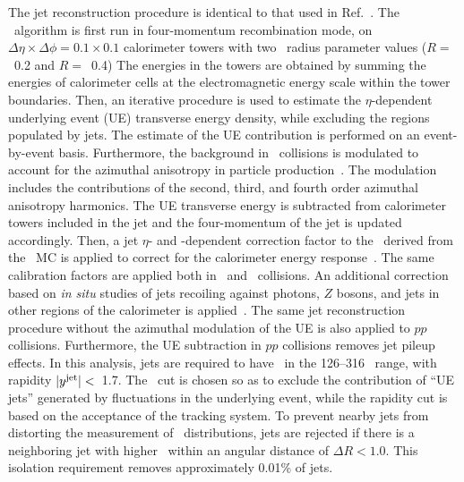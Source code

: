 
The jet reconstruction procedure is identical to that used in Ref.~\cite{2019108}. The \antikt\ algorithm \cite{Cacciari:2008qp, Fastjet} is first run in four-momentum recombination mode, on
$\Delta \eta \times \Delta \phi = 0.1\times 0.1$  calorimeter towers with two \antikt\ radius parameter values ($R=$~0.2 and $R=$~0.4) The energies in the towers are obtained by summing the
	energies of calorimeter cells at the electromagnetic energy scale within the tower boundaries. Then,
	  an iterative procedure is used to estimate the $\eta$-dependent underlying event (UE)  transverse energy density, while excluding the regions populated by jets. The estimate of the UE contribution is performed on an event-by-event basis.
	Furthermore, the background in \pbpb\ collisions is modulated to account for the azimuthal anisotropy in particle production~\cite{ATLAS:2012at}. The modulation includes the contributions of the second, third, and fourth order azimuthal anisotropy harmonics.
	The UE transverse energy is subtracted from calorimeter towers included in the jet and the four-momentum of the jet is updated accordingly.
	  Then, a jet $\eta$- and \pT-dependent  correction factor to the \ptjet\ 
	  derived from the \pp\ MC is applied to correct for the calorimeter energy
	  response~\cite{Aaboud:2017jcu}. The same calibration factors are applied both 
in \pp\ and \pbpb\ collisions.
An additional correction based on \textit{in situ} studies of jets recoiling against photons, $Z$ bosons, and jets in other regions of the calorimeter is
	  applied~\cite{ATL-PHYS-PUB-2015-036,2019167}. The same jet reconstruction procedure without the
	  azimuthal modulation of the UE is also applied to $pp$ collisions.
	  Furthermore, the UE subtraction in $pp$ collisions removes jet pileup effects.
	  In this analysis, jets are required to have \ptjet\ in the 126--316 \GeV\ range, with rapidity  $|\mbox{$y^{\mathrm{jet}}$}|<$~1.7. The \ptjet\ cut is chosen so as to exclude the contribution of ``UE jets'' generated by fluctuations in the underlying event, while the rapidity cut is based on the acceptance of the tracking system.	  
 To prevent nearby jets from distorting the measurement of \Dptr\ distributions, 
jets are rejected if there is a neighboring jet with higher \ptjet\ 
within an angular distance of $\Delta R < 1.0$. This isolation requirement removes approximately 0.01\% of jets.

